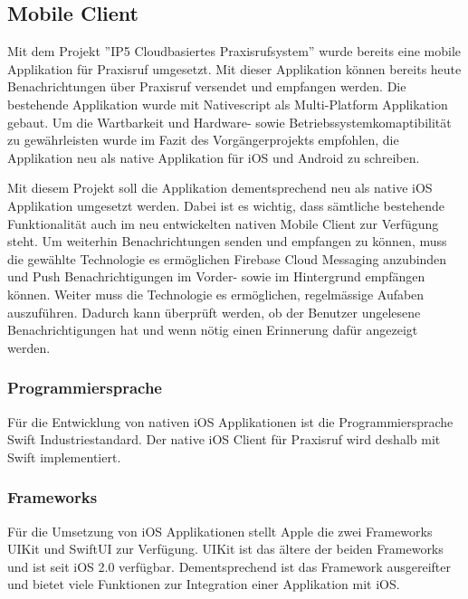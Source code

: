 
\subsection{Mobile Client}

Mit dem Projekt ''IP5 Cloudbasiertes Praxisrufsystem'' wurde bereits eine mobile Applikation für Praxisruf umgesetzt.
Mit dieser Applikation können bereits heute Benachrichtungen über Praxisruf versendet und empfangen werden.\cite{ip5}
Die bestehende Applikation wurde mit Nativescript\cite{nativescript} als Multi-Platform Applikation gebaut.
Um die Wartbarkeit und Hardware- sowie Betriebssystemkomaptibilität zu gewährleisten wurde im Fazit des Vorgängerprojekts empfohlen,
die Applikation neu als native Applikation für iOS und Android zu schreiben.\cite{ip5}

Mit diesem Projekt soll die Applikation dementsprechend neu als native iOS Applikation umgesetzt werden.
Dabei ist es wichtig, dass sämtliche bestehende Funktionalität auch im neu entwickelten nativen Mobile Client zur Verfügung steht.
Um weiterhin Benachrichtungen senden und empfangen zu können, muss die gewählte Technologie es ermöglichen Firebase Cloud Messaging anzubinden
und Push Benachrichtigungen im Vorder- sowie im Hintergrund empfängen können.
Weiter muss die Technologie es ermöglichen, regelmässige Aufaben auszuführen.
Dadurch kann überprüft werden, ob der Benutzer ungelesene Benachrichtigungen hat und wenn nötig einen Erinnerung dafür angezeigt werden.

\subsubsection{Programmiersprache}

Für die Entwicklung von nativen iOS Applikationen ist die Programmiersprache Swift Industriestandard.\cite{ios_swift}
Der native iOS Client für Praxisruf wird deshalb mit Swift implementiert.

\subsubsection{Frameworks}

Für die Umsetzung von iOS Applikationen stellt Apple die zwei Frameworks UIKit\cite{ios_uikit} und SwiftUI\cite{ios_swift_ui} zur Verfügung.
UIKit ist das ältere der beiden Frameworks und ist seit iOS 2.0 verfügbar.
Dementsprechend ist das Framework ausgereifter und bietet viele Funktionen zur Integration einer Applikation mit iOS.\cite{ios_uikit}


